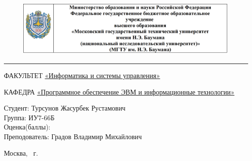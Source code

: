 \documentclass[a4paper, 12pt]{article}
\begin{document}
	
\begin{titlepage}
	\fontsize{12pt}{12pt}\selectfont
	\begin{figure}[t!]
		\centering
		\includegraphics[scale=0.8]{bmstu}
	\end{figure}
	
	\noindent\rule{15cm}{3pt}
	\newline\newline
	\noindent 
	ФАКУЛЬТЕТ 
	\underline{«Информатика и системы управления»} \newline\newline
	
	\noindent КАФЕДРА \underline{«Программное обеспечение ЭВМ и информационные технологии»}\newline\newline\newline\newline
	
	\vspace{1mm}
	
	\vspace{15mm}
	
	
	\begin{flushleft}
		{\large Студент: Турсунов Жасурбек Рустамович \\ Группа: ИУ7-66Б
			\\Оценка(баллы):
			\vspace{3mm}
			\\Преподователь: Градов Владимир Михайлович }
	\end{flushleft}
	
	\begin{center}
		\vfill
		Москва, \the\year
		~г.
	\end{center}
\end{titlepage}

\tableofcontents
\clearpage
\newpage
\end{document}
